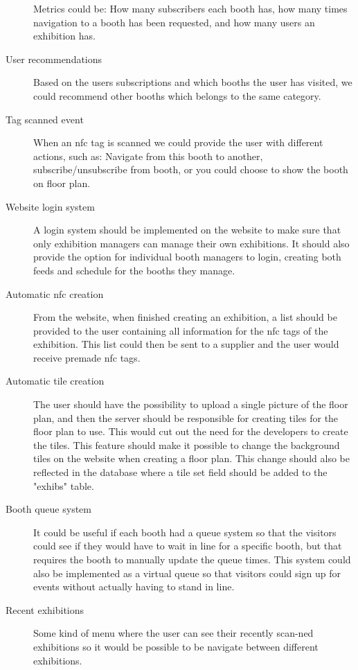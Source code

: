 \begin{description}
Metrics could be: How many subscribers each booth has, how many times navigation to a booth has been requested, and how many users an exhibition has.
\item[User recommendations] Based on the users subscriptions and which booths the user has visited, we could recommend other booths which belongs to the same category.
\item[Tag scanned event] When an \ac{nfc} tag is scanned we could provide the user with different actions, such as: Navigate from this booth to another, subscribe/unsubscribe from booth, or you could choose to show the booth on floor plan.
\item[Website login system] A login system should be implemented on the website to make sure that only exhibition managers can manage their own exhibitions. It should also provide the option for individual booth managers to login, creating both feeds and schedule for the booths they manage.
\item[Automatic \ac{nfc} creation] From the website, when finished creating an exhibition, a list should be provided to the user containing all information for the \ac{nfc} tags of the exhibition. This list could then be sent to a supplier and the user would receive premade \ac{nfc} tags.
\item[Automatic tile creation] The user should have the possibility to upload a single picture of the floor plan, and then the server should be responsible for creating tiles for the floor plan to use. This would cut out the need for the developers to create the tiles. This feature should make it possible to change the background tiles on the website when creating a floor plan. This change should also be reflected in the database where a tile set field should be added to the "exhibs" table.
\item[Booth queue system] It could be useful if each booth had a queue system so that the visitors could see if they would have to wait in line for a specific booth, but that requires the booth to manually update the queue times. This system could also be implemented as a virtual queue so that visitors could sign up for events without actually having to stand in line.
\item[Recent exhibitions] Some kind of menu where the user can see their recently scan-ned exhibitions so it would be possible to be navigate between different exhibitions. 

\end{description}
